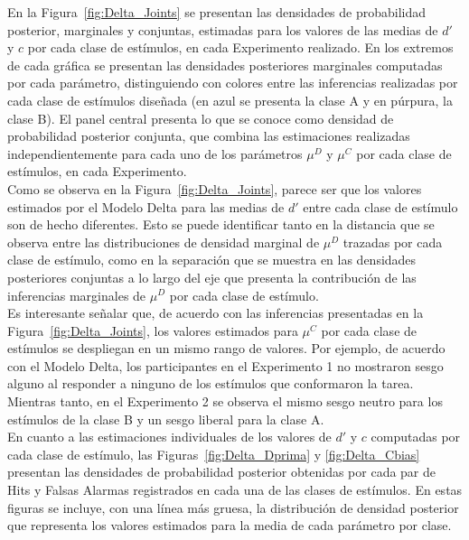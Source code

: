 En la Figura~\ref{fig:Delta_Joints} se presentan las densidades de probabilidad posterior, marginales y conjuntas, estimadas para los valores de las medias de $d'$ y $c$ por cada clase de estímulos, en cada Experimento realizado. En los extremos de cada gráfica se presentan las densidades posteriores marginales computadas por cada parámetro, distinguiendo con colores entre las inferencias realizadas por cada clase de estímulos diseñada (en azul se presenta la clase A y en púrpura, la clase B). El panel central presenta lo que se conoce como densidad de probabilidad posterior conjunta, que combina las estimaciones realizadas independientemente para cada uno de los parámetros $\mu^D$ y $\mu^C$ por cada clase de estímulos, en cada Experimento.\\ 

Como se observa en la Figura~\ref{fig:Delta_Joints}, parece ser que los valores estimados por el Modelo Delta para las medias de $d'$ entre cada clase de estímulo son de hecho diferentes. Esto se puede identificar tanto en la distancia que se observa entre las distribuciones de densidad marginal de $\mu^D$ trazadas por cada clase de estímulo, como en la separación que se muestra en las densidades posteriores conjuntas a lo largo del eje que presenta la contribución de las inferencias marginales de $\mu^D$ por cada clase de estímulo.\\

Es interesante señalar que, de acuerdo con las inferencias presentadas en la Figura~\ref{fig:Delta_Joints}, los valores estimados para $\mu^C$ por cada clase de estímulos se despliegan en un mismo rango de valores. Por ejemplo, de acuerdo con el Modelo Delta, los participantes en el Experimento 1 no mostraron sesgo alguno al responder a ninguno de los estímulos que conformaron la tarea. Mientras tanto, en el Experimento 2 se observa el mismo sesgo neutro para los estímulos de la clase B y un sesgo liberal para la clase A.\\

En cuanto a las estimaciones individuales de los valores de $d'$ y $c$ computadas por cada clase de estímulo, las Figuras~\ref{fig:Delta_Dprima} y \ref{fig:Delta_Cbias} presentan las densidades de probabilidad posterior obtenidas por cada par de Hits y Falsas Alarmas registrados en cada una de las clases de estímulos. En estas figuras se incluye, con una línea más gruesa, la distribución de densidad posterior que representa los valores estimados para la media de cada parámetro por clase.\\

